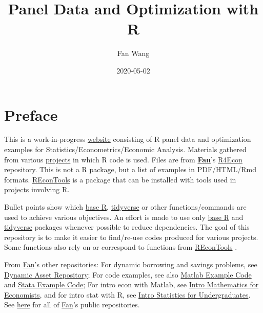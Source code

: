 \documentclass[
]{book}
\title{Panel Data and Optimization with R}
\author{Fan Wang}
\date{2020-05-02}
\begin{document}
\maketitle

{
\hypersetup{linkcolor=}
\setcounter{tocdepth}{1}
\tableofcontents
}
\hypertarget{preface}{%
\chapter*{Preface}\label{preface}}

This is a work-in-progress \href{https://fanwangecon.github.io/R4Econ/}{website} consisting of R panel data and optimization examples for Statistics/Econometrics/Economic Analysis. Materials gathered from various \href{https://fanwangecon.github.io/research}{projects} in which R code is used. Files are from \href{https://fanwangecon.github.io/}{\textbf{Fan}}'s \href{https://github.com/FanWangEcon/R4Econ}{R4Econ} repository. This is not a R package, but a list of examples in PDF/HTML/Rmd formats. \href{https://fanwangecon.github.io/REconTools/}{REconTools} is a package that can be installed with tools used in \href{https://fanwangecon.github.io/research}{projects} involving R.

Bullet points show which \href{https://www.rdocumentation.org/packages/base/versions/3.5.2}{base R}, \href{https://www.tidyverse.org/}{tidyverse} or other functions/commands are used to achieve various objectives. An effort is made to use only \href{https://www.rdocumentation.org/packages/base/versions/3.5.2}{base R} \citep{R-base} and \href{https://www.tidyverse.org/}{tidyverse} \citep{R-tidyverse} packages whenever possible to reduce dependencies. The goal of this repository is to make it easier to find/re-use codes produced for various projects. Some functions also rely on or correspond to functions from \href{https://fanwangecon.github.io/REconTools/}{REconTools} \citep{R-REconTools}.

From \href{https://fanwangecon.github.io/}{Fan}'s other repositories: For dynamic borrowing and savings problems, see \href{https://fanwangecon.github.io/CodeDynaAsset/}{Dynamic Asset Repository}; For code examples, see also \href{https://fanwangecon.github.io/M4Econ/}{Matlab Example Code} and \href{https://fanwangecon.github.io/Stata4Econ/}{Stata Example Code}; For intro econ with Matlab, see \href{https://fanwangecon.github.io/Math4Econ/}{Intro Mathematics for Economists}, and for intro stat with R, see \href{https://fanwangecon.github.io/Stat4Econ/}{Intro Statistics for Undergraduates}. See \href{https://github.com/FanWangEcon}{here} for all of \href{https://fanwangecon.github.io/}{Fan}'s public repositories.
\end{document}
